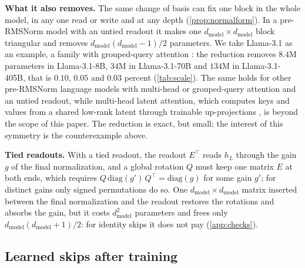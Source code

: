 \documentclass[10pt]{article}
\theoremstyle{definition}
\theoremstyle{remark}
\newcommand{\dm}{d_{\mathrm{model}}}
\newcommand{\para}[1]{\smallskip\noindent\textbf{#1}\hspace{0.5em}}
\begin{document}
\para{What it also removes.} The same change of basis can fix one block in the whole model, in any one read or write and at any depth (\cref{prop:normalform}). In a pre-RMSNorm model with an untied readout it makes one $\dm \times \dm$ block triangular and removes $\dm(\dm-1)/2$ parameters. We take Llama-3.1 as an example, a family with grouped-query attention \citep{grattafiori2024llama3}: the reduction removes $8.4$M parameters in Llama-3.1-8B, $34$M in Llama-3.1-70B and $134$M in Llama-3.1-405B, that is $0.10$, $0.05$ and $0.03$ percent (\cref{tab:scale}). The same holds for other pre-RMSNorm language models with multi-head or grouped-query attention and an untied readout, while multi-head latent attention, which computes keys and values from a shared low-rank latent through trainable up-projections \citep[Section~2.1.1]{deepseek2024v3}, is beyond the scope of this paper. The reduction is exact, but small; the interest of this symmetry is the counterexample above.

\para{Tied readouts.} With a tied readout, the readout $E^\top$ reads $h_L$ through the gain $g$ of the final normalization, and a global rotation $Q$ must keep one matrix $E$ at both ends, which requires $Q\,\mathrm{diag}(g')\,Q^\top = \mathrm{diag}(g)$ for some gain $g'$; for distinct gains only signed permutations do so. One $\dm \times \dm$ matrix inserted between the final normalization and the readout restores the rotations and absorbs the gain, but it costs $\dm^2$ parameters and frees only $\dm(\dm+1)/2$: for identity skips it does not pay (\cref{app:checks}).

\subsection{Learned skips after training}\label{sec:learned}
\end{document}
